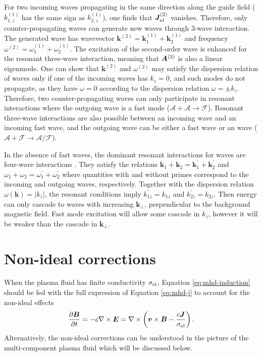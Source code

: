 For two incoming \alfven waves propagating in the same direction along the guide field ($k^{(1)}_{1,z}$ has the same sign as $k^{(1)}_{2,z}$), one finds that $\boldsymbol{J}^{(2)}_{\rm nl}$ vanishes. Therefore, only counter-propagating \alfven waves can generate new waves through 3-wave interaction.
The generated wave has wavevector $\boldsymbol{k}^{(2)} = \boldsymbol{k}^{(1)}_1+ \boldsymbol{k}^{(1)}_2$ and frequency $\omega^{(2)} = \omega^{(1)}_1+\omega^{(1)}_2$. 
The excitation of the second-order wave is enhanced for the resonant three-wave interaction, meaning that $\boldsymbol{A}^{(2)}$ is also a linear eigenmode. One can show that $\boldsymbol{k}^{(2)}$ and $\omega^{(2)}$ may satisfy the dispersion relation of \alfven waves only if
one of the incoming waves has $k_z = 0$, and such modes do not propagate, as they have $\omega=0$ according to the dispersion relation $\omega=\pm k_z$.
Therefore, two counter-propagating \alfven waves can only participate in resonant interactions where the outgoing wave is a fast mode ($\mathcal{A}+\mathcal{A}\rightarrow \mathcal{F}$).
Resonant three-wave interactions are also possible between an incoming \alfven wave and an incoming fast wave, and the outgoing wave can be either a fast wave or an \alfven wave ($\mathcal{A}+\mathcal{F}\rightarrow \mathcal{A/F}$).

In the absence of fast waves, the dominant resonant interactions for \alfven waves are four-wave interactions \citep{1994ApJ...432..612S}. 
They satisfy the relations $\boldsymbol{k}_1+ \boldsymbol{k}_2 = \boldsymbol{k}^\prime_1+ \boldsymbol{k}^\prime_2$ and $\omega_1+\omega_2 = \omega^\prime_1+\omega^\prime_2$ 
where quantities with and without primes correspond to the incoming and outgoing \alfven waves, respectively. Together with the dispersion relation $\omega(\boldsymbol{k})=|k_z|$, the resonant conditions imply $k^\prime_{1z}=k_{1z}$ and $k^\prime_{2z}=k_{2z}$. 
Then energy can only cascade to waves with increasing $\boldsymbol{k}_\perp$, perpendicular to the background magnetic field.
Fast mode excitation will allow some cascade in $k_z$, however it will be weaker than the cascade in $\boldsymbol{k}_\perp$.

\section{Non-ideal corrections}
\label{sec:nonideal}

When the plasma fluid has finite conductivity $\sigma_{\rm el}$, Equation \ref{eq:mhd-induction} should be fed with the full expression of Equation \ref{eq:mhd-j} to account for the non-ideal effects
\begin{eqnarray}\label{eq:mhd-induction-nonideal}
	\frac{\partial \boldsymbol{B}}{\partial t} = -c\nabla\times\boldsymbol{E} = \nabla\times\left(\boldsymbol{v}\times\boldsymbol{B}-\frac{c\boldsymbol{J}}{\sigma_{\rm el}}\right).
\end{eqnarray}
Alternatively, the non-ideal corrections can be understood in the picture of the multi-component plasma fluid which will be discussed below.

